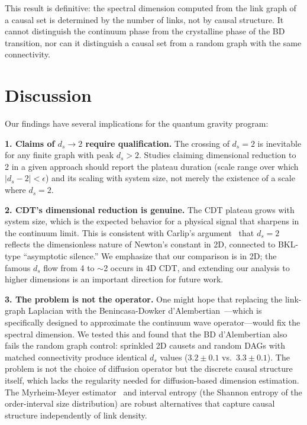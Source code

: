 \documentclass[aps,prd,twocolumn,superscriptaddress,nofootinbib]{revtex4-2}
\begin{document}
This result is definitive: the spectral dimension computed from the link graph of a causal set is determined by the number of links, not by causal structure. It cannot distinguish the continuum phase from the crystalline phase of the BD transition, nor can it distinguish a causal set from a random graph with the same connectivity.

\section{Discussion}

Our findings have several implications for the quantum gravity program:

\textbf{1. Claims of $d_s \to 2$ require qualification.} The crossing of $d_s = 2$ is inevitable for any finite graph with peak $d_s > 2$. Studies claiming dimensional reduction to 2 in a given approach should report the plateau duration (scale range over which $|d_s - 2| < \epsilon$) and its scaling with system size, not merely the existence of a scale where $d_s = 2$.

\textbf{2. CDT's dimensional reduction is genuine.} The CDT plateau grows with system size, which is the expected behavior for a physical signal that sharpens in the continuum limit. This is consistent with Carlip's argument~\cite{carlip2017} that $d_s = 2$ reflects the dimensionless nature of Newton's constant in 2D, connected to BKL-type ``asymptotic silence.'' We emphasize that our comparison is in 2D; the famous $d_s$ flow from 4 to $\sim$2 occurs in 4D CDT, and extending our analysis to higher dimensions is an important direction for future work.

\textbf{3. The problem is not the operator.} One might hope that replacing the link-graph Laplacian with the Benincasa-Dowker d'Alembertian~\cite{benincasa2010}---which is specifically designed to approximate the continuum wave operator---would fix the spectral dimension. We tested this and found that the BD d'Alembertian also fails the random graph control: sprinkled 2D causets and random DAGs with matched connectivity produce identical $d_s$ values ($3.2 \pm 0.1$ vs.\ $3.3 \pm 0.1$). The problem is not the choice of diffusion operator but the discrete causal structure itself, which lacks the regularity needed for diffusion-based dimension estimation. The Myrheim-Meyer estimator~\cite{myrheim1978,meyer1988} and interval entropy (the Shannon entropy of the order-interval size distribution) are robust alternatives that capture causal structure independently of link density.
\end{document}
